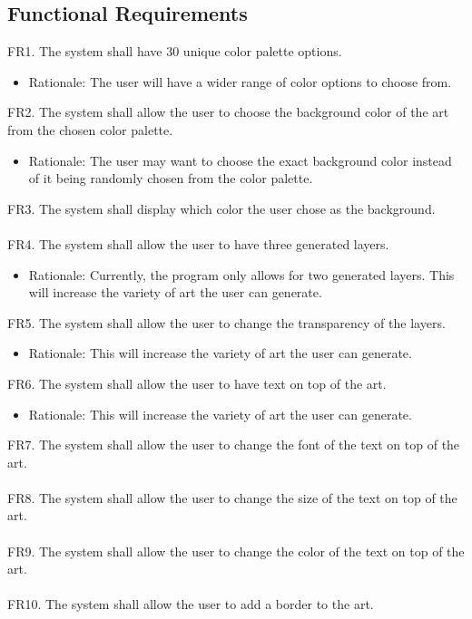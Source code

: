 \documentclass[12pt, titlepage]{article}
\begin{document}
\subsection{Functional Requirements}
FR1. The system shall have 30 unique color palette options.
\begin{itemize}
    \item Rationale: The user will have a wider range of color options to choose from.
\end{itemize}
FR2. The system shall allow the user to choose the background color of the art from the chosen color palette.
\begin{itemize}
    \item Rationale: The user may want to choose the exact background color instead of it being randomly chosen from the color palette.
\end{itemize}
FR3. The system shall display which color the user chose as the background.\\
\\
FR4. The system shall allow the user to have three generated layers.
\begin{itemize}
    \item Rationale: Currently, the program only allows for two generated layers. This will increase the variety of art the user can generate.
\end{itemize}
FR5. The system shall allow the user to change the transparency of the layers.
\begin{itemize}
    \item Rationale: This will increase the variety of art the user can generate.
\end{itemize}
FR6. The system shall allow the user to have text on top of the art.
\begin{itemize}
    \item Rationale: This will increase the variety of art the user can generate.
\end{itemize}
FR7. The system shall allow the user to change the font of the text on top of the art.\\
\\
FR8. The system shall allow the user to change the size of the text on top of the art.\\
\\
FR9. The system shall allow the user to change the color of the text on top of the art.\\
\\
FR10. The system shall allow the user to add a border to the art.
\end{document}
